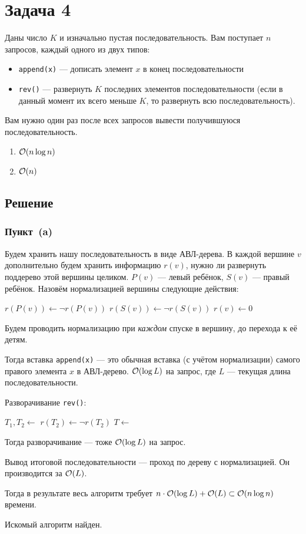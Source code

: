 \section{Задача 4}
Даны число $K$ и изначально пустая последовательность. Вам поступает $n$ запросов, каждый одного из двух типов:
\begin{itemize}
    \item \texttt{append(x)} --- дописать элемент $x$ в конец последовательности
    \item \texttt{rev()} ---
    развернуть $K$ последних элементов последовательности (если в данный момент их всего меньше $K$, то
    развернуть всю последовательность).
\end{itemize}

Вам нужно один раз после всех запросов вывести получившуюся последовательность.
\begin{enumerate}[label=(\alph*)]
    \item $\mathcal{O}(n \log{n})$
    \item $\mathcal{O}(n)$
\end{enumerate}

\subsection{Решение}
\subsubsection{Пункт~(a)}
Будем хранить нашу последовательность в виде АВЛ-дерева.
В каждой вершине $v$ дополнительно будем хранить информацию $r(v)$, нужно ли развернуть поддерево этой вершины целиком.
$P(v)$ --- левый ребёнок, $S(v)$ --- правый ребёнок.
Назовём нормализацией вершины следующие действия:
\begin{algorithmic}
        \State $r(P(v)) \gets \lnot r(P(v))$
        \State $r(S(v)) \gets \lnot r(S(v))$
        \State {}
        \State $r(v) \gets 0$
    \EndIf
\end{algorithmic}

Будем проводить нормализацию при \emph{каждом} спуске в вершину, до перехода к её детям.

Тогда вставка \texttt{append(x)} --- это обычная вставка (с учётом нормализации)
самого правого элемента $x$ в АВЛ-дерево.
$\mathcal{O}(\log L)$ на запрос, где $L$ --- текущая длина последовательности.

Разворачивание \texttt{rev()}:
\begin{algorithmic}
    \State $T_1, T_2 \gets$ 
    \State $r(T_2) \gets \lnot r(T_2)$
    \State $T \gets$ 
\end{algorithmic}

Тогда разворачивание --- тоже $\mathcal{O}(\log L)$ на запрос.

Вывод итоговой последовательности --- проход по дереву с нормализацией.
Он производится за $\mathcal{O}(L)$.

Тогда в результате весь алгоритм требует $n \cdot \mathcal{O}(\log L) + \mathcal{O}(L) \subset \mathcal{O}(n \log n)$
времени.

Искомый алгоритм найден.
